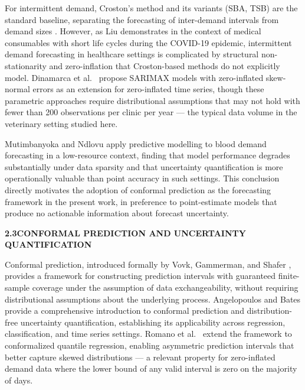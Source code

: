\documentclass[12pt,a4paper]{article}
\begin{document}
\noindent For intermittent demand, Croston's method and its variants (SBA, TSB) are the standard baseline, separating the forecasting of inter-demand intervals from demand sizes \cite{croston1972}. However, as Liu \cite{liu2020} demonstrates in the context of medical consumables with short life cycles during the COVID-19 epidemic, intermittent demand forecasting in healthcare settings is complicated by structural non-stationarity and zero-inflation that Croston-based methods do not explicitly model. Dinamarca et al.\ \cite{dinamarca2025} propose SARIMAX models with zero-inflated skew-normal errors as an extension for zero-inflated time series, though these parametric approaches require distributional assumptions that may not hold with fewer than 200 observations per clinic per year — the typical data volume in the veterinary setting studied here.

\noindent Mutimbanyoka and Ndlovu \cite{mutimbanyoka2025} apply predictive modelling to blood demand forecasting in a low-resource context, finding that model performance degrades substantially under data sparsity and that uncertainty quantification is more operationally valuable than point accuracy in such settings. This conclusion directly motivates the adoption of conformal prediction as the forecasting framework in the present work, in preference to point-estimate models that produce no actionable information about forecast uncertainty.

\vspace{1.5em}
\noindent\textbf{2.3\quad CONFORMAL PREDICTION AND UNCERTAINTY QUANTIFICATION}
\vspace{0.6em}

\noindent Conformal prediction, introduced formally by Vovk, Gammerman, and Shafer \cite{vovk2005}, provides a framework for constructing prediction intervals with guaranteed finite-sample coverage under the assumption of data exchangeability, without requiring distributional assumptions about the underlying process. Angelopoulos and Bates \cite{angelopoulos2021} provide a comprehensive introduction to conformal prediction and distribution-free uncertainty quantification, establishing its applicability across regression, classification, and time series settings. Romano et al.\ \cite{romano2019} extend the framework to conformalized quantile regression, enabling asymmetric prediction intervals that better capture skewed distributions — a relevant property for zero-inflated demand data where the lower bound of any valid interval is zero on the majority of days.
\end{document}
